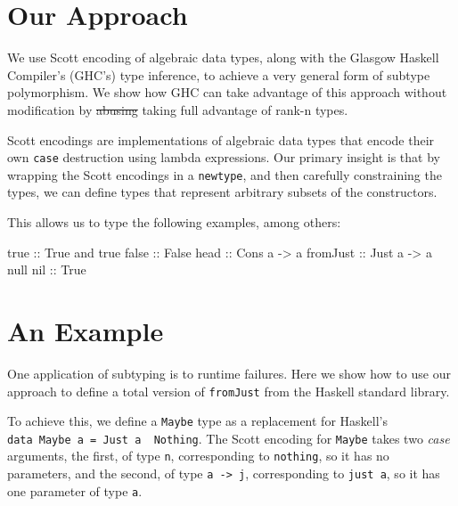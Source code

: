 \documentclass[]{article}
\newenvironment{Shaded}{}{}
\newcommand{\DataTypeTok}[1]{\textcolor[rgb]{0.56,0.13,0.00}{{#1}}}
\newcommand{\OtherTok}[1]{\textcolor[rgb]{0.00,0.44,0.13}{{#1}}}
\newcommand{\NormalTok}[1]{{#1}}
\begin{document}
\section{Our Approach}\label{our-approach}

We use Scott encoding of algebraic data types, along with the Glasgow
Haskell Compiler's (GHC's) type inference, to achieve a very general
form of subtype polymorphism. We show how GHC can take advantage of this
approach without modification by \sout{abusing} taking full advantage of
rank-n types.

Scott encodings are implementations of algebraic data types that encode
their own \texttt{case} destruction using lambda expressions. Our
primary insight is that by wrapping the Scott encodings in a
\texttt{newtype}, and then carefully constraining the types, we can
define types that represent arbitrary subsets of the constructors.

This allows us to type the following examples, among others:

\begin{Shaded}
\begin{Highlighting}[]
\OtherTok{   true ::} \DataTypeTok{True}
   \NormalTok{and true}\OtherTok{ false ::} \DataTypeTok{False}
\OtherTok{   head ::} \DataTypeTok{Cons} \NormalTok{a }\OtherTok{->} \NormalTok{a}
\OtherTok{   fromJust ::} \DataTypeTok{Just} \NormalTok{a }\OtherTok{->} \NormalTok{a}
   \NormalTok{null}\OtherTok{ nil ::} \DataTypeTok{True}
\end{Highlighting}
\end{Shaded}

\section{An Example}\label{an-example}

One application of subtyping is to runtime failures. Here we show how to
use our approach to define a total version of \texttt{fromJust} from the
Haskell standard library.

To achieve this, we define a \texttt{Maybe} type as a replacement for
Haskell's \texttt{data\ Maybe\ a\ =\ Just\ a\ \textbar{}\ Nothing}. The
Scott encoding for \texttt{Maybe} takes two \emph{case} arguments, the
first, of type \texttt{n}, corresponding to \texttt{nothing}, so it has
no parameters, and the second, of type \texttt{a\ -\textgreater{}\ j},
corresponding to \texttt{just\ a}, so it has one parameter of type
\texttt{a}.
\end{document}
